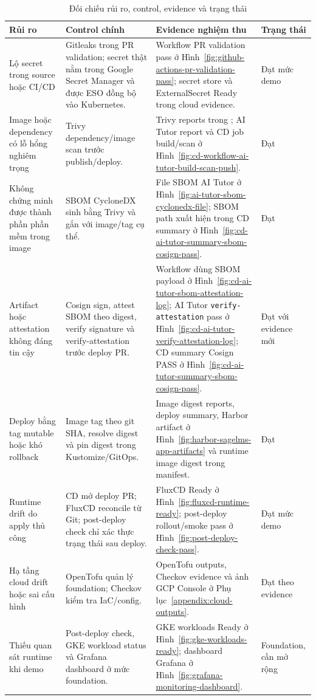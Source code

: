\begingroup
\small
{}
\renewcommand{\arraystretch}{1.08}
\begin{table}[H]
\centering
\caption{Đối chiếu rủi ro, control, evidence và trạng thái}
\label{tab:threat-control-evidence-status}
\begin{tabularx}{\textwidth}{|p{}|p{}|Y|p{0.14\textwidth}|}
\hline
\textbf{Rủi ro} & \textbf{Control chính} & \textbf{Evidence nghiệm thu} & \textbf{Trạng thái} \\
\hline
Lộ secret trong source hoặc CI/CD & Gitleaks trong PR validation; secret thật nằm trong Google Secret Manager và được ESO đồng bộ vào Kubernetes. & Workflow PR validation pass ở Hình~\ref{fig:github-actions-pr-validation-pass}; secret store và ExternalSecret Ready trong cloud evidence. & Đạt mức demo \\
Image hoặc dependency có lỗ hổng nghiêm trọng & Trivy dependency/image scan trước publish/deploy. & Trivy reports trong ; AI Tutor report và CD job build/scan ở Hình~\ref{fig:cd-workflow-ai-tutor-build-scan-push}. & Đạt \\
Không chứng minh được thành phần phần mềm trong image & SBOM CycloneDX sinh bằng Trivy và gắn với image/tag cụ thể. & File SBOM AI Tutor ở Hình~\ref{fig:ai-tutor-sbom-cyclonedx-file}; SBOM path xuất hiện trong CD summary ở Hình~\ref{fig:cd-ai-tutor-summary-sbom-cosign-pass}. & Đạt \\
Artifact hoặc attestation không đáng tin cậy & Cosign sign, attest SBOM theo digest, verify signature và verify-attestation trước deploy PR. & Workflow dùng SBOM payload ở Hình~\ref{fig:cd-ai-tutor-sbom-attestation-log}; AI Tutor \texttt{verify-attestation} pass ở Hình~\ref{fig:cd-ai-tutor-verify-attestation-log}; CD summary Cosign PASS ở Hình~\ref{fig:cd-ai-tutor-summary-sbom-cosign-pass}. & Đạt với evidence mới \\
Deploy bằng tag mutable hoặc khó rollback & Image tag theo git SHA, resolve digest và pin digest trong Kustomize/GitOps. & Image digest reports, deploy summary, Harbor artifact ở Hình~\ref{fig:harbor-sagelms-app-artifacts} và runtime image digest trong manifest. & Đạt \\
Runtime drift do apply thủ công & CD mở deploy PR; FluxCD reconcile từ Git; post-deploy check chỉ xác thực trạng thái sau deploy. & FluxCD Ready ở Hình~\ref{fig:fluxcd-runtime-ready}; post-deploy rollout/smoke pass ở Hình~\ref{fig:post-deploy-check-pass}. & Đạt mức demo \\
Hạ tầng cloud drift hoặc sai cấu hình & OpenTofu quản lý foundation; Checkov kiểm tra IaC/config. & OpenTofu outputs, Checkov evidence và ảnh GCP Console ở Phụ lục~\ref{appendix:cloud-outputs}. & Đạt theo evidence \\
Thiếu quan sát runtime khi demo & Post-deploy check, GKE workload status và Grafana dashboard ở mức foundation. & GKE workloads Ready ở Hình~\ref{fig:gke-workloads-ready}; dashboard Grafana ở Hình~\ref{fig:grafana-monitoring-dashboard}. & Foundation, cần mở rộng \\
\hline
\end{tabularx}
\end{table}
\endgroup

